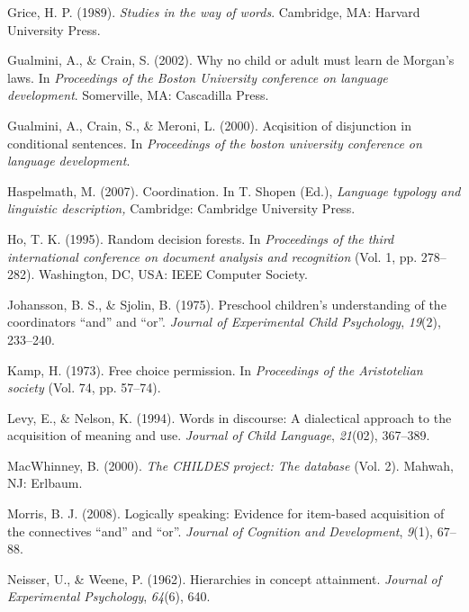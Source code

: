 \documentclass[,man,floatsintext]{apa6}
\begin{document}
\leavevmode\hypertarget{ref-grice1989studies}{}%
Grice, H. P. (1989). \emph{Studies in the way of words}. Cambridge, MA: Harvard University Press.

\leavevmode\hypertarget{ref-gualminicrain2002}{}%
Gualmini, A., \& Crain, S. (2002). Why no child or adult must learn de Morgan's laws. In \emph{Proceedings of the Boston University conference on language development}. Somerville, MA: Cascadilla Press.

\leavevmode\hypertarget{ref-gualmini2000}{}%
Gualmini, A., Crain, S., \& Meroni, L. (2000). Acqisition of disjunction in conditional sentences. In \emph{Proceedings of the boston university conference on language development}.

\leavevmode\hypertarget{ref-haspelmath2007}{}%
Haspelmath, M. (2007). Coordination. In T. Shopen (Ed.), \emph{Language typology and linguistic description,} Cambridge: Cambridge University Press.

\leavevmode\hypertarget{ref-ho1995random}{}%
Ho, T. K. (1995). Random decision forests. In \emph{Proceedings of the third international conference on document analysis and recognition} (Vol. 1, pp. 278--282). Washington, DC, USA: IEEE Computer Society.

\leavevmode\hypertarget{ref-johansson1975preschool}{}%
Johansson, B. S., \& Sjolin, B. (1975). Preschool children's understanding of the coordinators ``and'' and ``or''. \emph{Journal of Experimental Child Psychology}, \emph{19}(2), 233--240.

\leavevmode\hypertarget{ref-kamp1973free}{}%
Kamp, H. (1973). Free choice permission. In \emph{Proceedings of the Aristotelian society} (Vol. 74, pp. 57--74).

\leavevmode\hypertarget{ref-levy1994words}{}%
Levy, E., \& Nelson, K. (1994). Words in discourse: A dialectical approach to the acquisition of meaning and use. \emph{Journal of Child Language}, \emph{21}(02), 367--389.

\leavevmode\hypertarget{ref-macwhinney2000childes}{}%
MacWhinney, B. (2000). \emph{The CHILDES project: The database} (Vol. 2). Mahwah, NJ: Erlbaum.

\leavevmode\hypertarget{ref-morris2008logically}{}%
Morris, B. J. (2008). Logically speaking: Evidence for item-based acquisition of the connectives ``and'' and ``or''. \emph{Journal of Cognition and Development}, \emph{9}(1), 67--88.

\leavevmode\hypertarget{ref-neisser1962hierarchies}{}%
Neisser, U., \& Weene, P. (1962). Hierarchies in concept attainment. \emph{Journal of Experimental Psychology}, \emph{64}(6), 640.
\end{document}
